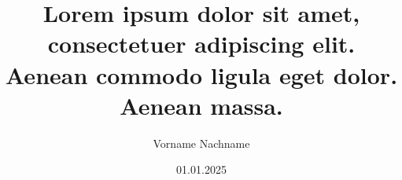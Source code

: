 \def\NameOfUniversity{International University of Applied Sciences\\Internationale Hochschule}
\def\TypeOfStudy{Fernstudium}
\def\NameOfStudyProgram{Master of Science (M.Sc.)\\Wirtschaftsinformatik}
\def\TypeOfWork{Fallstudie}
\def\NameOfCourse{Modul: DLMWIWPBA02 – Betriebliche Anwendungssysteme}
\title{Lorem ipsum dolor sit amet, consectetuer adipiscing elit.\\Aenean commodo ligula eget dolor.\\Aenean massa.}
\author{Vorname Nachname}
\def\StudentNumber{Matrikelnummer: 0123456789}
\date{01.01.2025}
\def\NameOfProf{Betreut durch: Prof. Dr. Vorname Nachname}
